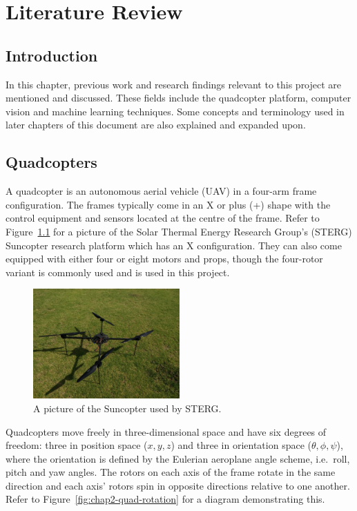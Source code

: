 \chapter{Literature Review}
\label{chap2}

\section{Introduction}

In this chapter, previous work and research findings relevant to this project are mentioned and discussed. These fields include the quadcopter platform, computer vision and machine learning techniques. Some concepts and terminology used in later chapters of this document are also explained and expanded upon.

\section{Quadcopters}

A quadcopter is an autonomous aerial vehicle (UAV) in a four-arm frame configuration. The frames typically come in an X or plus (+) shape with the control equipment and sensors located at the centre of the frame. Refer to Figure~\ref{fig:chap2-quad} for a picture of the Solar Thermal Energy Research Group's (STERG) Suncopter research platform which has an X configuration. They can also come equipped with either four or eight motors and props, though the four-rotor variant is commonly used and is used in this project.

\begin{figure}
  \centering
  \includegraphics[clip, trim = 0 0 30 20, width=0.5\textwidth]{figures/chapter2/quadcopter}
  \caption[A picture of the Suncopter used by STERG.]{A picture of the Suncopter used by STERG.}
\label{fig:chap2-quad}
\end{figure}

Quadcopters move freely in three-dimensional space and have six degrees of freedom: three in position space ($x, y, z$) and three in orientation space ($\theta, \phi, \psi$), where the orientation is defined by the Eulerian aeroplane angle scheme, i.e.\ roll, pitch and yaw angles. The rotors on each axis of the frame rotate in the same direction and each axis' rotors spin in opposite directions relative to one another. Refer to Figure~\ref{fig:chap2-quad-rotation} for a diagram demonstrating this. 

